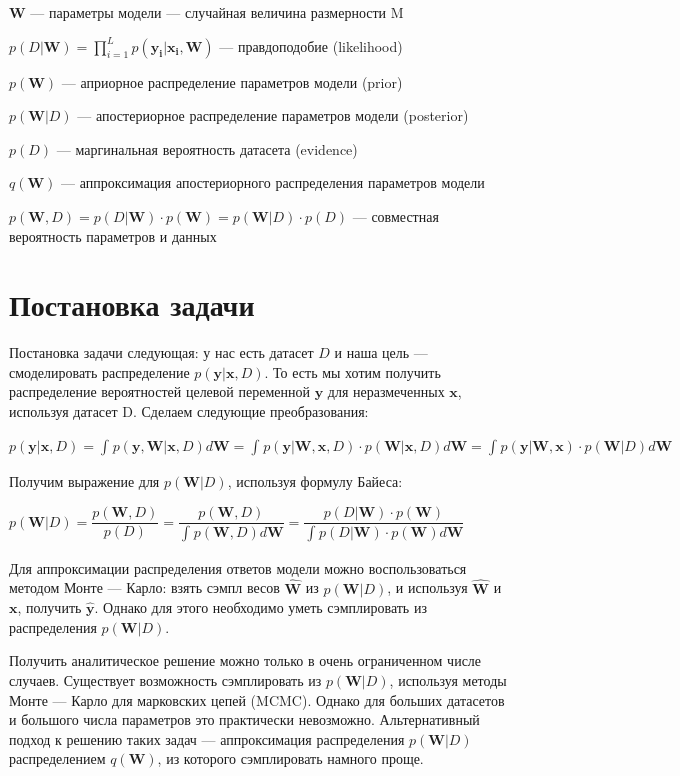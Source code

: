 \documentclass{article}
\begin{document}
$\mathbf{W}$ — параметры модели — случайная величина размерности M

$p(D | \mathbf{W}) = \prod_{i=1}^{L} p(\mathbf{y_i} | \mathbf{x_i}, \mathbf{W})$ — правдоподобие (likelihood)

$p(\mathbf{W})$ — априорное распределение параметров модели (prior)

$p(\mathbf{W}| D)$ — апостериорное распределение параметров модели (posterior)

$p(D)$ — маргинальная вероятность датасета (evidence)

$q(\mathbf{W})$ — аппроксимация апостериорного распределения параметров модели

$p(\mathbf{W}, D) =
p(D | \mathbf{W}) \cdot p(\mathbf{W}) =
p(\mathbf{W}| D)\cdot p(D)$
— совместная вероятность параметров и данных

\section{Постановка задачи}
Постановка задачи следующая: у нас есть датасет $D$ и наша цель — смоделировать распределение $p(\mathbf{y} | \mathbf{x}, D)$. То есть мы хотим получить распределение вероятностей целевой переменной $\mathbf{y}$ для неразмеченных $\mathbf{x}$, используя датасет D. Сделаем следующие преобразования:

$p(\mathbf{y} | \mathbf{x}, D) =
\int_{}{} p(\mathbf{y}, \mathbf{W} | \mathbf{x}, D) d\mathbf{W} =
\int_{}{} p(\mathbf{y} | \mathbf{W}, \mathbf{x}, D) \cdot p(\mathbf{W} | \mathbf{x}, D) d\mathbf{W} =
\int_{}{} p(\mathbf{y} | \mathbf{W}, \mathbf{x}) \cdot p(\mathbf{W} | D) d\mathbf{W}$

Получим выражение для $p(\mathbf{W}| D)$, используя формулу Байеса:

$p(\mathbf{W}| D) =
\dfrac{p(\mathbf{W}, D)}{p(D)} =
\dfrac{p(\mathbf{W}, D)}{\int_{}{} p(\mathbf{W}, D) d\mathbf{W}} =
\dfrac{p(D | \mathbf{W}) \cdot p(\mathbf{W})}{\int_{}{} p(D | \mathbf{W}) \cdot p(\mathbf{W}) d\mathbf{W}} $

Для аппроксимации распределения ответов модели можно воспользоваться методом Монте — Карло: взять сэмпл весов $\hat{\mathbf{W}}$ из $p(\mathbf{W}| D)$, и используя $\hat{\mathbf{W}}$ и $\mathbf{x}$, получить $\hat{\mathbf{y}}$. Однако для этого необходимо уметь сэмплировать из распределения $p(\mathbf{W}| D)$.

Получить аналитическое решение можно только в очень ограниченном числе случаев. Существует возможность сэмплировать из $p(\mathbf{W}| D)$, используя методы Монте — Карло для марковских цепей (MCMC). Однако для больших датасетов и большого числа параметров это практически невозможно. Альтернативный подход к решению таких задач — аппроксимация распределения $p(\mathbf{W}| D)$ распределением $q(\mathbf{W})$, из которого сэмплировать намного проще.
\end{document}
